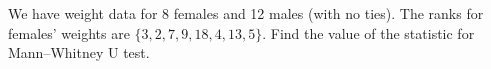 
\begin{question}
We have weight data for 8 females and 12 males (with no ties). The ranks for females' weights are \(\{3, 2, 7, 9, 18, 4, 13, 5\}\). Find the value of the statistic for Mann--Whitney U test.
\end{question}


